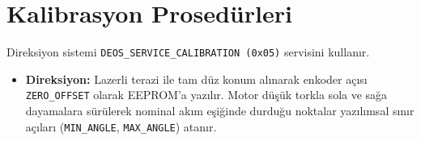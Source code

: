\documentclass[a4paper,10pt]{article}
\newcommand{\code}[1]{\texttt{#1}}
\begin{document}
\section{Kalibrasyon Prosedürleri}
Direksiyon sistemi \code{DEOS\_SERVICE\_CALIBRATION (0x05)} servisini kullanır.
\begin{itemize}
    \item \textbf{Direksiyon:} Lazerli terazi ile tam düz konum alınarak enkoder açısı \code{ZERO\_OFFSET} olarak EEPROM'a yazılır. Motor düşük torkla sola ve sağa dayamalara sürülerek nominal akım eşiğinde durduğu noktalar yazılımsal sınır açıları (\code{MIN\_ANGLE}, \code{MAX\_ANGLE}) atanır.
\end{itemize}
\end{document}
